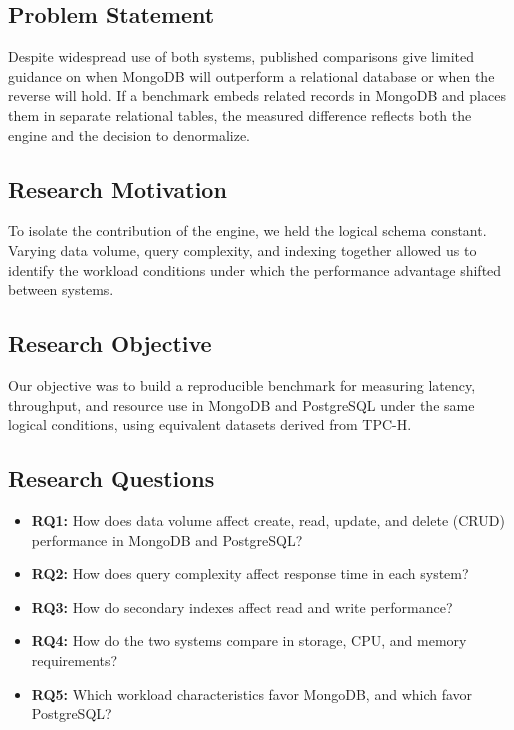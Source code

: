 \documentclass[10pt,a4paper,twocolumn]{article}
\begin{document}
\subsection{Problem Statement}
Despite widespread use of both systems, published comparisons give limited guidance on when MongoDB will outperform a relational database or when the reverse will hold. If a benchmark embeds related records in MongoDB and places them in separate relational tables, the measured difference reflects both the engine and the decision to denormalize.

\subsection{Research Motivation}
To isolate the contribution of the engine, we held the logical schema constant. Varying data volume, query complexity, and indexing together allowed us to identify the workload conditions under which the performance advantage shifted between systems.

\subsection{Research Objective}
Our objective was to build a reproducible benchmark for measuring latency, throughput, and resource use in MongoDB and PostgreSQL under the same logical conditions, using equivalent datasets derived from TPC-H.

\subsection{Research Questions}
\begin{itemize}
  \item \textbf{RQ1:} How does data volume affect create, read, update, and delete (CRUD) performance in MongoDB and PostgreSQL?
  \item \textbf{RQ2:} How does query complexity affect response time in each system?
  \item \textbf{RQ3:} How do secondary indexes affect read and write performance?
  \item \textbf{RQ4:} How do the two systems compare in storage, CPU, and memory requirements?
  \item \textbf{RQ5:} Which workload characteristics favor MongoDB, and which favor PostgreSQL?
\end{itemize}

\end{document}
